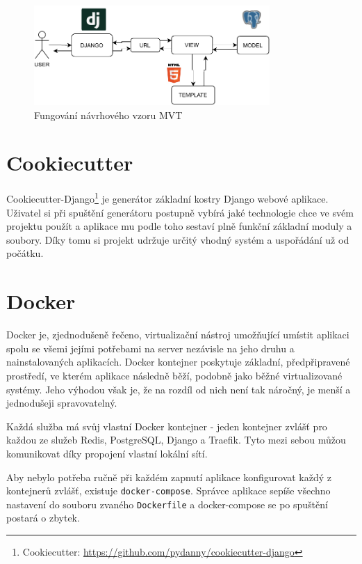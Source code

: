 \begin{figure}
    \centering
    \includegraphics[width=0.8\textwidth]{obrazky-figures/MVT.pdf}
    \caption{Fungování návrhového vzoru MVT}
    \label{fig:MVT}
\end{figure}

\section{Cookiecutter}
Cookiecutter-Django\footnote{Cookiecutter: \url{https://github.com/pydanny/cookiecutter-django}} je generátor základní kostry Django webové aplikace. Uživatel si při spuštění generátoru postupně vybírá jaké technologie chce ve svém projektu použít a aplikace mu podle toho sestaví plně funkční základní moduly a soubory. Díky tomu si projekt udržuje určitý vhodný systém a uspořádání už od počátku.

\section{Docker}
Docker je, zjednodušeně řečeno, virtualizační nástroj umožňující umístit aplikaci spolu se všemi jejími potřebami na server nezávisle na jeho druhu a nainstalovaných aplikacích. Docker kontejner poskytuje základní, předpřipravené prostředí, ve kterém aplikace následně běží, podobně jako běžné virtualizované systémy. Jeho výhodou však je, že na rozdíl od nich není tak náročný, je menší a jednodušeji spravovatelný.  

\par Každá služba má svůj vlastní Docker kontejner - jeden kontejner zvlášť pro každou ze služeb Redis, PostgreSQL, Django a Traefik. Tyto mezi sebou můžou komunikovat díky propojení vlastní lokální sítí. 

\par 
Aby nebylo potřeba ručně při každém zapnutí aplikace konfigurovat každý z kontejnerů zvlášť, existuje \texttt{docker-compose}. Správce aplikace sepíše všechno nastavení do souboru zvaného \texttt{Dockerfile} a docker-compose se po spuštění postará o zbytek.

